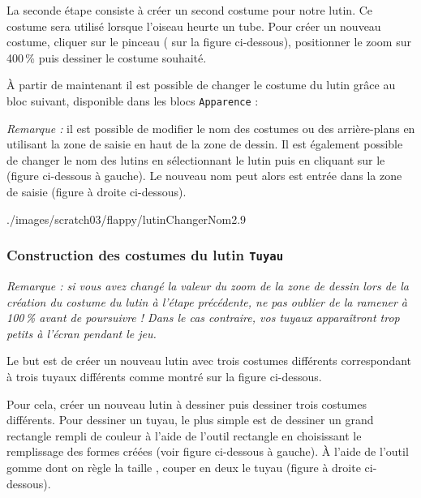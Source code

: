 



La seconde étape consiste à créer un second costume pour notre lutin. Ce costume sera utilisé lorsque l'oiseau heurte un tube. Pour créer un nouveau costume, cliquer sur le pinceau ( sur la figure ci-dessous), positionner le zoom sur 400\,\% puis dessiner le costume souhaité. 



À partir de maintenant il est possible de changer le costume du lutin grâce au bloc suivant, disponible dans les blocs \texttt{Apparence} :



\emph{Remarque :} il est possible de modifier le nom des costumes ou des arrière-plans en utilisant la zone de saisie en haut de la zone de dessin. Il est également possible de changer le nom des lutins en sélectionnant le lutin puis en cliquant sur le  (figure ci-dessous à gauche). Le nouveau nom peut alors est entrée dans la zone de saisie (figure à droite ci-dessous).

%
	      {./images/scratch03/flappy/lutinChangerNom2}{.9\textwidth}


\subsubsection{Construction des costumes du lutin \texttt{Tuyau}}\label{costumesLutinTuyau} 

\emph{Remarque : si vous avez changé la valeur du zoom de la zone de dessin lors de la création du costume du lutin à l'étape précédente, ne pas oublier de la ramener à 100\,\% avant de poursuivre ! Dans le cas contraire, vos tuyaux apparaîtront trop petits à l'écran pendant le jeu.}

\vspace{6pt}

Le but est de créer un nouveau lutin avec trois costumes différents correspondant à trois tuyaux différents comme montré sur la figure ci-dessous.



Pour cela, créer un nouveau lutin à dessiner puis dessiner trois costumes différents. Pour dessiner un tuyau, le plus simple est de dessiner un grand rectangle rempli de couleur à l'aide de l'outil rectangle  en choisissant le remplissage des formes créées  (voir figure ci-dessous à gauche). À l'aide de l'outil gomme  dont on règle la taille , couper en deux le tuyau (figure à droite ci-dessous).  

